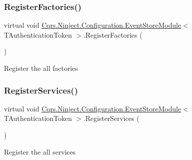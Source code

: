 \subsubsection{\texorpdfstring{Register\+Factories()}{RegisterFactories()}}
{\footnotesize\ttfamily virtual void \hyperlink{classCqrs_1_1Ninject_1_1Configuration_1_1EventStoreModule}{Cqrs.\+Ninject.\+Configuration.\+Event\+Store\+Module}$<$ T\+Authentication\+Token $>$.Register\+Factories (\begin{DoxyParamCaption}{ }\end{DoxyParamCaption})\hspace{0.3cm}{\ttfamily [virtual]}}



Register the all factories 

\mbox{\label{classCqrs_1_1Ninject_1_1Configuration_1_1EventStoreModule_a72c71c7ccd12ca4ef434e3eea4dce7db_a72c71c7ccd12ca4ef434e3eea4dce7db}} 
\subsubsection{\texorpdfstring{Register\+Services()}{RegisterServices()}}
{\footnotesize\ttfamily virtual void \hyperlink{classCqrs_1_1Ninject_1_1Configuration_1_1EventStoreModule}{Cqrs.\+Ninject.\+Configuration.\+Event\+Store\+Module}$<$ T\+Authentication\+Token $>$.Register\+Services (\begin{DoxyParamCaption}{ }\end{DoxyParamCaption})\hspace{0.3cm}{\ttfamily [virtual]}}



Register the all services 

